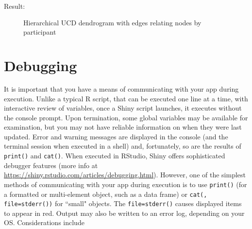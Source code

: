 \documentclass[10pt, letterpaper]{article}
\begin{document}
\begin{spacing}{1.0}
Result:

\begin{figure}[H]
    \centering
    \caption{Hierarchical UCD dendrogram with edges relating nodes by participant}
    \label{fg:edgebund4}
\end{figure}


\section{Debugging}\label{sec:debugging}

It is important that you have a means of communicating with your app during execution.  Unlike a typical R script, that can be executed one line at a time, with interactive review of variables, once a Shiny script launches, it executes without the console prompt.  Upon termination, some global variables may be available for examination, but you may not have reliable information on when they were last updated.  Error and warning messages are displayed in the console (and the terminal session when executed in a shell) and, fortunately, so are the results of \texttt{print()} and \texttt{cat()}.  When executed in RStudio, Shiny offers sophisticated debugger features (more info at \url{https://shiny.rstudio.com/articles/debugging.html}).  However, one of the simplest methods of communicating with your app during execution is to use \texttt{print()} (for a formatted or multi-element object, such as a data frame) or \texttt{cat(, file=stderr())} for ``small" objects.  The \texttt{file=stderr()} causes displayed items to appear in red.  Output may also be written to an error log, depending on your OS.  Considerations include


\end{spacing}
\end{document}
